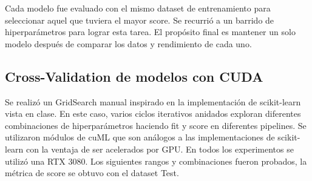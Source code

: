 \documentclass[journal]{IEEEtran}
\begin{document}
Cada modelo fue evaluado con el mismo dataset de entrenamiento para seleccionar aquel que tuviera el mayor score. Se recurrió a un barrido de hiperparámetros para lograr esta tarea. El propósito final es mantener un solo modelo después de comparar los datos y rendimiento de cada uno.

\subsection{Cross-Validation de modelos con CUDA}
Se realizó un GridSearch manual inspirado en la implementación de scikit-learn vista en clase\cite{scikit-learn_gridsearchcv}. En este caso, varios ciclos iterativos anidados exploran diferentes combinaciones de hiperparámetros haciendo fit y score en diferentes pipelines. Se utilizaron módulos de cuML\cite{cuml2023} que son análogos a las implementaciones de scikit-learn con la ventaja de ser acelerados por GPU. En todos los experimentos se utilizó una RTX 3080. Los siguientes rangos y combinaciones fueron probados, la métrica de score se obtuvo con el dataset Test.
\end{document}
